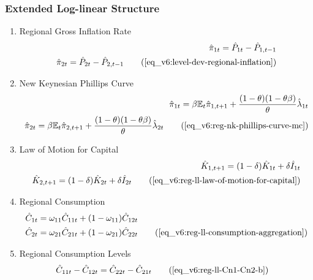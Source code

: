 \documentclass[../thesis.tex]{subfiles}
\begin{document}
{\singlespacing
	
	\subsubsection{Extended Log-linear Structure}
	
	\begin{enumerate}
		
		\item Regional Gross Inflation Rate
		\begin{align}
			\hat{\pi}_{1 t} = \hat{P}_{1 t} - \hat{P}_{1, t-1} \nonumber \\
			\hat{\pi}_{2 t} = \hat{P}_{2 t} - \hat{P}_{2, t-1} \tag{\ref{eq_v6:level-dev-regional-inflation}}
		\end{align}
		
		\item New Keynesian Phillips Curve
		\begin{align}
			\hat{\pi}_{1 t} = \beta \E \hat{\pi}_{1, t+1} + \frac{(1-\theta) (1- \theta \beta)}{\theta} \hat{\lambda}_{1 t} \nonumber \\
			\hat{\pi}_{2 t} = \beta \E \hat{\pi}_{2, t+1} + \frac{(1-\theta) (1- \theta \beta)}{\theta} \hat{\lambda}_{2 t} \tag{\ref{eq_v6:reg-nk-phillips-curve-mc}}
		\end{align}
		
		\item Law of Motion for Capital
		\begin{alignat}{2}
			\hat{K}_{1, t+1} = (1-\delta) \hat{K}_{1 t} + \delta \hat{I}_{1 t} \nonumber \\
			\hat{K}_{2, t+1} = (1-\delta) \hat{K}_{2 t} + \delta \hat{I}_{2 t} \tag{\ref{eq_v6:reg-ll-law-of-motion-for-capital}} 
		\end{alignat}


		\item Regional Consumption 
		\begin{align}
			\hat{C}_{1t} &= \omega_{11} \hat{C}_{11t} + (1-\omega_{11}) \hat{C}_{12t} \nonumber \\ 
			\hat{C}_{2t} &= \omega_{21} \hat{C}_{21t} + (1-\omega_{21}) \hat{C}_{22t} \tag{\ref{eq_v6:reg-ll-consumption-aggregation}}
		\end{align}
		
		\item Regional Consumption Levels 
		\begin{align}
			\hat{C}_{11t} - \hat{C}_{12t} &= \hat{C}_{22t} - \hat{C}_{21t} \tag{\ref{eq_v6:reg-ll-Cn1-Cn2-b}}
		\end{align}


\end{enumerate}}
\end{document}
